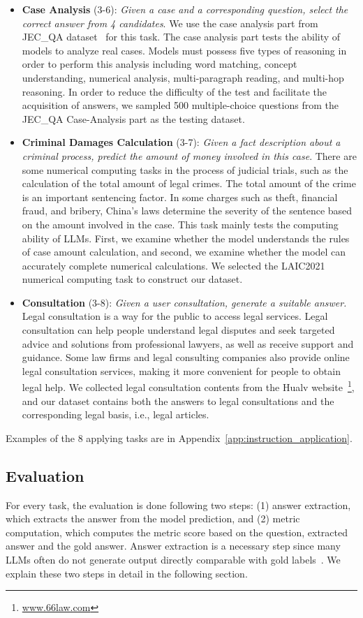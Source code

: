 \begin{itemize}
    \item \textbf{Case Analysis} (3-6): \emph{Given a case and a corresponding question, select the correct answer from 4 candidates}. We use the case analysis part from JEC\_QA dataset~\cite{zhong2020jec} for this task. The case analysis part tests the ability of models to analyze real cases. Models must possess five types of reasoning in order to perform this analysis including word matching, concept understanding, numerical analysis, multi-paragraph reading, and multi-hop reasoning. In order to reduce the difficulty of the test and facilitate the acquisition of answers, we sampled 500 multiple-choice questions from the JEC\_QA Case-Analysis part as the testing dataset.
    \item \textbf{Criminal Damages Calculation} (3-7): \emph{Given a fact description about a criminal process, predict the amount of money involved in this case}.
There are some numerical computing tasks in the process of judicial trials, such as the calculation of the total amount of legal crimes. The total amount of the crime is an important sentencing factor. In some charges such as theft, financial fraud, and bribery, China's laws determine the severity of the sentence based on the amount involved in the case. This task mainly tests the computing ability of LLMs. First, we examine whether the model understands the rules of case amount calculation, and second, we examine whether the model can accurately complete numerical calculations. We selected the LAIC2021 numerical computing task to construct our dataset.
    \item \textbf{Consultation} (3-8):
\emph{Given a user consultation, generate a suitable answer.}
Legal consultation is a way for the public to access legal services. Legal consultation can help people understand legal disputes and seek targeted advice and solutions from professional lawyers, as well as receive support and guidance. Some law firms and legal consulting companies also provide online legal consultation services, making it more convenient for people to obtain legal help. 
We collected legal consultation contents from the Hualv website~\footnote{\url{www.66law.com}}, and our dataset contains both the answers to legal consultations and the corresponding legal basis, i.e., legal articles.
\end{itemize}

Examples of the 8 applying tasks are in Appendix~\ref{app:instruction_application}.

\subsection{Evaluation}
For every task,  the evaluation is done following two steps: (1) answer extraction, which extracts the answer from the model prediction, and (2) metric computation, which computes the metric score based on the question, extracted answer and the gold answer. Answer extraction is a necessary step since many LLMs often do not generate output directly comparable with gold labels~\cite{adlakha2023evaluating}. We explain these two steps in detail in the following section.
